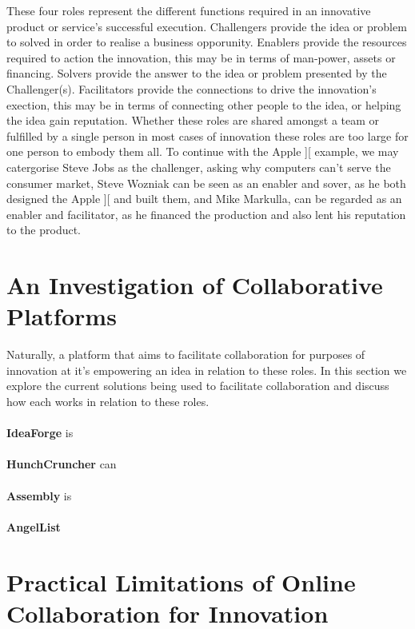 These four roles represent the different functions required in an innovative product or service's successful execution. Challengers provide the idea or problem to solved in order to realise a business opporunity. Enablers provide the resources required to action the innovation, this may be in terms of man-power, assets or financing. Solvers provide the answer to the idea or problem presented by the Challenger(s). Facilitators provide the connections to drive the innovation's exection, this may be in terms of connecting other people to the idea, or helping the idea gain reputation. Whether these roles are shared amongst a team or fulfilled by a single person in most cases of innovation these roles are too large for one person to embody them all. To continue with the Apple ][ example, we may catergorise Steve Jobs as the challenger, asking why computers can't serve the consumer market, Steve Wozniak can be seen as an enabler and sover, as he both designed the Apple ][ and built them, and Mike Markulla, can be regarded as an enabler and facilitator, as he financed the production and also lent his reputation to the product. 

\section{An Investigation of Collaborative Platforms}
Naturally, a platform that aims to facilitate collaboration for purposes of innovation at it's empowering an idea in relation to these roles. In this section we explore the current solutions being used to facilitate collaboration and discuss how each works in relation to these roles.
\\
\\
\textbf{IdeaForge}\cite{ideaForge:online} is
\\
\\
\textbf{HunchCruncher} can
\\
\\
\textbf{Assembly} is
\\
\\
\textbf{AngelList}



\section{Practical Limitations of Online Collaboration for Innovation}